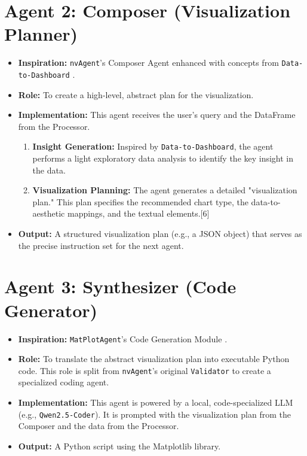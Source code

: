 \documentclass[a4paper,oneside,bibliography=totoc]{scrbook}
\begin{document}
\section{Agent 2: Composer (Visualization Planner)}
\begin{itemize}
 \item \textbf{Inspiration:} \texttt{nvAgent}'s Composer Agent \cite{[6]} enhanced with concepts from \texttt{Data-to-Dashboard} \cite{[11]}.
 \item \textbf{Role:} To create a high-level, abstract plan for the visualization.
 \item \textbf{Implementation:} This agent receives the user's query and the DataFrame from the Processor.
 \begin{enumerate}
 \item \textbf{Insight Generation:} Inspired by \texttt{Data-to-Dashboard}, the agent performs a light exploratory data analysis to identify the key insight in the data.
 \item \textbf{Visualization Planning:} The agent generates a detailed "visualization plan." This plan specifies the recommended chart type, the data-to-aesthetic mappings, and the textual elements.[6]
 \end{enumerate}
 \item \textbf{Output:} A structured visualization plan (e.g., a JSON object) that serves as the precise instruction set for the next agent.
\end{itemize}

\section{Agent 3: Synthesizer (Code Generator)}
\begin{itemize}
 \item \textbf{Inspiration:} \texttt{MatPlotAgent}'s Code Generation Module \cite{[7]}.
 \item \textbf{Role:} To translate the abstract visualization plan into executable Python code. This role is split from \texttt{nvAgent}'s original \texttt{Validator} to create a specialized coding agent.
 \item \textbf{Implementation:} This agent is powered by a local, code-specialized LLM (e.g., \texttt{Qwen2.5-Coder}). It is prompted with the visualization plan from the Composer and the data from the Processor.
 \item \textbf{Output:} A Python script using the Matplotlib library.
\end{itemize}
\end{document}
